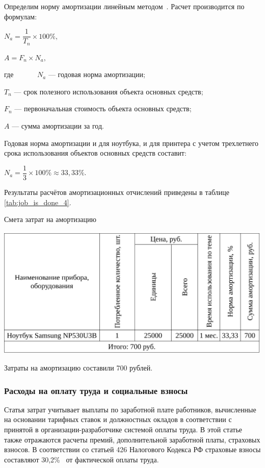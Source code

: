 Определим норму амортизации линейным методом~\cite{frolova}. Расчет производится по формулам:

\begin{center}
 $ N_{a} = \dfrac{1}{T_{n}}\times 100\%,$
 \end{center}
 \begin{center}
 $ A = F_{n}\times N_{a}, $
\end{center}
где~~~~~ \ $N_{a}$ --- годовая норма амортизации;

$T_{n}$ --- срок полезного использования объекта основных средств;

$F_{n}$ --- первоначальная стоимость объекта основных средств;

$A$ --- сумма амортизации за год.

Годовая норма амортизации и для ноутбука, и для принтера с учетом трехлетнего срока 
использования объектов основных средств составит:
\begin{center}
$ N_{a} = \dfrac{1}{3}\times 100\% \approx 33,33\%.$\\
\end{center}

Результаты расчётов амортизационных отчислений приведены в таблице \ref{tab:job_is_done_4}.

\begin{table}[!ht]
\caption{Смета затрат на амортизацию}
\centering
\includegraphics[page=1, width=1\linewidth]{tables/economics/schedule_4.pdf}
\label{tab:job_is_done_4}
\end{table}

Затраты на амортизацию составили 700 рублей.

\subsubsection{Расходы на оплату труда и социальные взносы}

Статья затрат учитывает выплаты по заработной плате работников, 
вычисленные на основании тарифных ставок и должностных окладов в соответствии с принятой в 
организации-разработчике системой оплаты труда. В этой статье также отражаются расчеты
премий, дополнительной заработной платы, страховых взносов.
В соответствии со статьей 426 Налогового Кодекса РФ страховые взносы составляют 30,2\%~\cite{strax} от фактической
оплаты труда.

